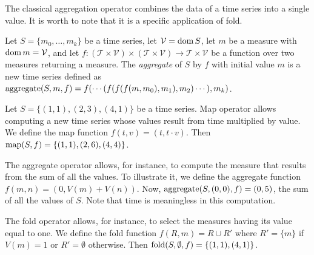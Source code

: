 The classical aggregation operator combines the data of a time series
into a single value.  It is worth to note that it is a specific
application of fold.

Let $S=\{m_0,\dots,m_k\}$ be a time series, let $\mathcal{V}=\operatorname{dom} S$,
let $m$ be a measure with $\operatorname{dom} m=\mathcal{V}$, and let 
%
$f:(\mathcal{T}\times\mathcal{V})\times(\mathcal{T}\times\mathcal{V})\rightarrow \mathcal{T}\times\mathcal{V}$ 
%
be a function over two measures returning a measure. The
\emph{aggregate} of $S$ by $f$ with initial value $m$ is a new time
series defined as $\operatorname*{aggregate}(S,m,f) = f(\cdots(f(f(f(m,m_0),\allowbreak
m_1),\allowbreak m_2)\cdots),\allowbreak m_k)$.  





\begin{example}
\label{ex:computational-operators}
Let $S=\{(1,1),(2,3),(4,1)\}$ be a time series.  Map operator allows
computing a new time series whose values result from time multiplied
by value.  We define the map function $f(t,v)=(t,t\cdot v)$. Then
$\operatorname*{map}(S,f)=\{(1,1),(2,6),(4,4)\}$.  
%


The aggregate operator allows, for instance, to compute the measure
that results from the sum of all the values.  To illustrate it, we
define the aggregate function $f(m,n)=(0,V(m)+V(n))$. Now,
$\operatorname*{aggregate}(S,(0,0),f) = (0,5)$, the sum of all the values of $S$. Note that
time is meaningless in this computation.

The fold operator allows, for instance, to select the measures having
its value equal to one.  We define the fold function $f(R,m)=R\cup R'$
where $R'=\{m\}$ if $V(m)=1$ or $R'=\emptyset$ otherwise. Then
$\operatorname*{fold}(S,\emptyset,f)=\{(1,1),(4,1)\}$.
\end{example}

